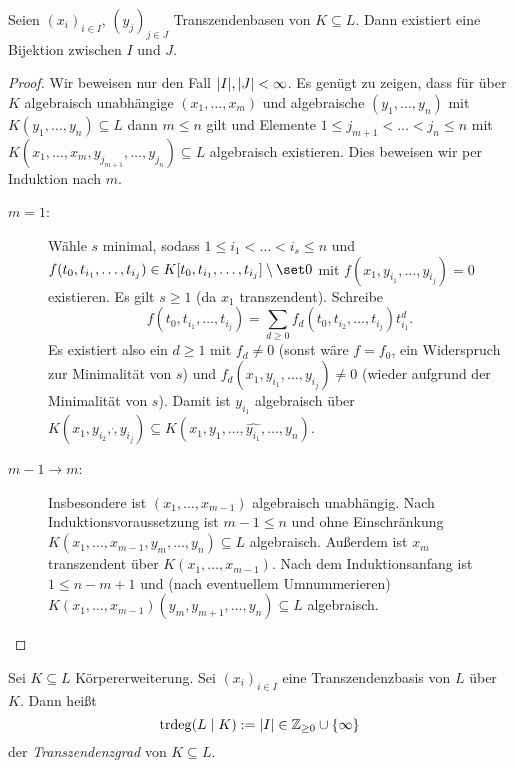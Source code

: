\documentclass[12pt,a4paper]{scrartcl}
\theoremstyle{cplain}
\theoremstyle{cdef}
\begin{document}
\begin{satz}
	Seien $(x_i)_{i\in I}$, $(y_j)_{j\in J}$ Transzendenbasen von $K\subseteq L$. Dann existiert eine Bijektion zwischen $I$ und $J$.
\end{satz}
\begin{proof}
	Wir beweisen nur den Fall $\lvert I\rvert, \lvert J\rvert <\infty$. Es genügt zu zeigen, dass für über $K$ algebraisch unabhängige $(x_1,\dots, x_m)$ und algebraische $(y_1,\dots, y_n)$ mit $K(y_1,\dots, y_n)\subseteq L$ dann $m\leq n$ gilt und Elemente $1\leq j_{m+1}<\dots < j_n\leq n$ mit $K(x_1,\dots, x_m, y_{j_{m+1}},\dots, y_{j_n})\subseteq L$ algebraisch existieren. Dies beweisen wir per Induktion nach $m$.
	\begin{description}
		\item[$m = 1$:] Wähle $s$ minimal, sodass $1\leq i_1<\dots <i_s\leq n$ und $f(t_0,t_{i_1}, \dots, t_{i_j})\in K[t_0, t_{i_1},\dots, t_{i_j}]\setminus \set 0$ mit $f(x_1, y_{i_1}, \dots, y_{i_j}) = 0$ existieren. Es gilt $s\geq 1$ (da $x_1$ transzendent). Schreibe
		\[f(t_0, t_{i_1},\dots, t_{i_j}) = \sum_{d\geq 0} f_d(t_0, t_{i_2}, \dots, t_{i_j})t_{i_1}^d.\]
		Es existiert also ein $d\geq 1$ mit $f_d \neq 0$ (sonst wäre $f = f_0$, ein Widerspruch zur Minimalität von $s$) und $f_d(x_1, y_{i_1},\dots, y_{i_j}) \neq 0$ (wieder aufgrund der Minimalität von $s$). Damit ist $y_{i_1}$ algebraisch über $K(x_1, y_{i_2},\dot, y_{i_j})\subseteq K(x_1,y_1,\dots, \hat{y_{i_1}},\dots, y_n)$.
		\item[$m-1\to m$:] Insbesondere ist $(x_1,\dots, x_{m-1})$ algebraisch unabhängig. Nach Induktionsvoraussetzung ist $m-1\leq n$ und ohne Einschränkung $K(x_1,\dots, x_{m-1}, y_m,\dots, y_n)\subseteq L$ algebraisch. Außerdem ist $x_m$ transzendent über $K(x_1,\dots, x_{m-1})$. Nach dem Induktionsanfang ist $1\leq n-m+1$ und (nach eventuellem Umnummerieren) $K(x_1,\dots, x_{m-1})(y_m, y_{m+1}, \dots , y_n)\subseteq L$ algebraisch.
		\qedhere
	\end{description}
\end{proof}
\begin{defi}
	Sei $K\subseteq L$ Körpererweiterung. Sei $(x_i)_{i\in I}$ eine Transzendenzbasis von $L$ über $K$. Dann heißt 
	\[\operatorname{trdeg}(L\mid K) := \lvert I\rvert\in\mathbb Z_{\geq 0}\cup \{\infty\}\]
	der \emph{Transzendenzgrad} von $K\subseteq L$.
\end{defi}
\end{document}
